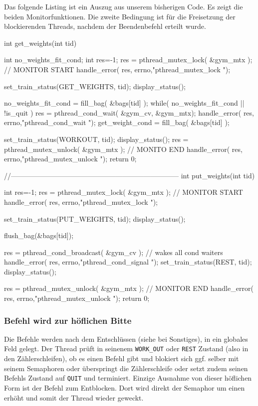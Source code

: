 \documentclass[
   draft=false
  ,paper=a4
  ,twoside=false
  ,fontsize=11pt
  ,headsepline
  ,BCOR10mm
  ,DIV11
  ,parskip=full+
]{scrartcl} %
\begin{document}
  Das folgende Listing ist ein Auszug aus unserem bisherigen Code. Es zeigt die
  beiden Monitorfunktionen. Die zweite Bedingung ist für die Freisetzung der
  blockierenden Threads, nachdem der Beendenbefehl erteilt wurde.

  \begin{ccode}
    int get_weights(int tid){
        int no_weights_fit_cond;
        int res=-1;
        res = pthread_mutex_lock( &gym_mtx );                 // MONITOR START
        handle_error( res, errno,"pthread_mutex_lock ");

        set_train_status(GET_WEIGHTS, tid);
        display_status();

        no_weights_fit_cond = fill_bag( &bags[tid] );
        while( no_weights_fit_cond  || !is_quit ){
            res = pthread_cond_wait( &gym_cv, &gym_mtx);
            handle_error( res, errno,"pthread_cond_wait ");
            get_weight_cond = fill_bag( &bags[tid] );
        }

        set_train_status(WORKOUT, tid);
        display_status();
        res = pthread_mutex_unlock( &gym_mtx );                  // MONITO END
        handle_error( res, errno,"pthread_mutex_unlock ");
        return 0;
    }
    //------------------------------------------------------------------------
    int put_weights(int tid){
        int res=-1;
        res = pthread_mutex_lock( &gym_mtx );                 // MONITOR START
        handle_error( res, errno,"pthread_mutex_lock ");

        set_train_status(PUT_WEIGHTS, tid);
        display_status();

        flush_bag(&bags[tid]);

        res = pthread_cond_broadcast( &gym_cv );     // wakes all cond waiters
        handle_error( res, errno,"pthread_cond_signal ");
        set_train_status(REST, tid);
        display_status();

        res = pthread_mutex_unlock( &gym_mtx );                 // MONITOR END
        handle_error( res, errno,"pthread_mutex_unlock ");
        return 0;
    }
  \end{ccode}

\subsubsection{Befehl wird zur höflichen Bitte}
  Die Befehle werden nach dem Entschlüssen (siehe bei Sonstiges), in ein
  globales Feld gelegt. Der Thread prüft in seinenem \texttt{WORK\_OUT}
  oder \texttt{REST} Zustand (also in den Zählerschleifen), ob es einen Befehl
  gibt und blokiert sich ggf. selber mit seinem Semaphoren oder überspringt
  die Zählerschleife oder setzt zudem seinen Befehls Zustand auf \texttt{QUIT}
  und terminiert. Einzige Ausnahme von dieser höflichen Form ist der
  Befehl zum Entblocken. Dort wird direkt der Semaphor um einen erhöht und
  somit der Thread wieder geweckt.
\end{document}
